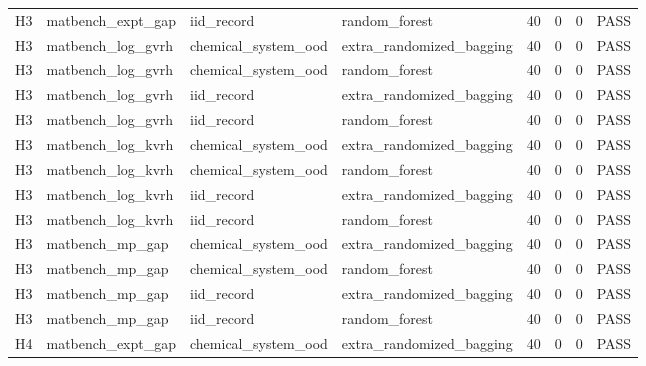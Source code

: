 \documentclass[10pt]{article}
\begin{document}
\begin{landscape}
\begin{longtable}{L{.32in}L{1.05in}L{1.2in}L{1.3in}L{.42in}L{.42in}L{.42in}L{.48in}}
H3 & matbench\_\allowbreak{}expt\_\allowbreak{}gap & iid\_\allowbreak{}record & random\_\allowbreak{}forest & 40 & 0 & 0 & PASS\\
H3 & matbench\_\allowbreak{}log\_\allowbreak{}gvrh & chemical\_\allowbreak{}system\_\allowbreak{}ood & extra\_\allowbreak{}randomized\_\allowbreak{}bagging & 40 & 0 & 0 & PASS\\
H3 & matbench\_\allowbreak{}log\_\allowbreak{}gvrh & chemical\_\allowbreak{}system\_\allowbreak{}ood & random\_\allowbreak{}forest & 40 & 0 & 0 & PASS\\
H3 & matbench\_\allowbreak{}log\_\allowbreak{}gvrh & iid\_\allowbreak{}record & extra\_\allowbreak{}randomized\_\allowbreak{}bagging & 40 & 0 & 0 & PASS\\
H3 & matbench\_\allowbreak{}log\_\allowbreak{}gvrh & iid\_\allowbreak{}record & random\_\allowbreak{}forest & 40 & 0 & 0 & PASS\\
H3 & matbench\_\allowbreak{}log\_\allowbreak{}kvrh & chemical\_\allowbreak{}system\_\allowbreak{}ood & extra\_\allowbreak{}randomized\_\allowbreak{}bagging & 40 & 0 & 0 & PASS\\
H3 & matbench\_\allowbreak{}log\_\allowbreak{}kvrh & chemical\_\allowbreak{}system\_\allowbreak{}ood & random\_\allowbreak{}forest & 40 & 0 & 0 & PASS\\
H3 & matbench\_\allowbreak{}log\_\allowbreak{}kvrh & iid\_\allowbreak{}record & extra\_\allowbreak{}randomized\_\allowbreak{}bagging & 40 & 0 & 0 & PASS\\
H3 & matbench\_\allowbreak{}log\_\allowbreak{}kvrh & iid\_\allowbreak{}record & random\_\allowbreak{}forest & 40 & 0 & 0 & PASS\\
H3 & matbench\_\allowbreak{}mp\_\allowbreak{}gap & chemical\_\allowbreak{}system\_\allowbreak{}ood & extra\_\allowbreak{}randomized\_\allowbreak{}bagging & 40 & 0 & 0 & PASS\\
H3 & matbench\_\allowbreak{}mp\_\allowbreak{}gap & chemical\_\allowbreak{}system\_\allowbreak{}ood & random\_\allowbreak{}forest & 40 & 0 & 0 & PASS\\
H3 & matbench\_\allowbreak{}mp\_\allowbreak{}gap & iid\_\allowbreak{}record & extra\_\allowbreak{}randomized\_\allowbreak{}bagging & 40 & 0 & 0 & PASS\\
H3 & matbench\_\allowbreak{}mp\_\allowbreak{}gap & iid\_\allowbreak{}record & random\_\allowbreak{}forest & 40 & 0 & 0 & PASS\\
H4 & matbench\_\allowbreak{}expt\_\allowbreak{}gap & chemical\_\allowbreak{}system\_\allowbreak{}ood & extra\_\allowbreak{}randomized\_\allowbreak{}bagging & 40 & 0 & 0 & PASS\\

\end{longtable}
\end{landscape}
\end{document}
